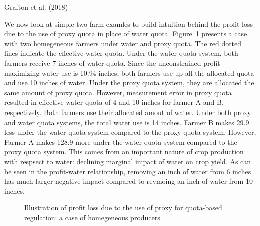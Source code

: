 \documentclass[
  letterpaper,
  DIV=11,
  numbers=noendperiod]{scrartcl}
\begin{document}
Grafton et al. (2018)

We now look at simple two-farm examles to build intuition behind the
profit loss due to the use of proxy quota in place of water quota.
Figure~\ref{fig-illust-homegeneous} presents a case with two homegeneous
farmers under water and proxy quota. The red dotted lines indicate the
effective water quota. Under the water quota system, both farmers
receive 7 inches of water quota. Since the unconstrained profit
maximizing water use is 10.94 inches, both farmers use up all the
allocated quota and use 10 inches of water. Under the proxy quota
system, they are allocated the same amount of proxy quota. However,
measurement error in proxy quota resulted in effective water quota of 4
and 10 inches for farmer A and B, respectively. Both farmers use their
allocated amout of water. Under both proxy and water quota systems, the
total water use is 14 inches. Farmer B makes 29.9 less under the water
quota system compared to the proxy quota system. However, Farmer A makes
128.9 more under the water quota system compared to the proxy quota
system. This comes from an important nature of crop production with
respsect to water: declining marginal impact of water on crop yield. As
can be seen in the profit-water relationship, removing an inch of water
from 6 inches has much larger negative impact compared to revmoing an
inch of water from 10 inches.

\begin{figure}[H]


\caption{\label{fig-illust-homegeneous}Illustration of profit loss due
to the use of proxy for quota-based regulation: a case of homegeneous
producers}

\end{figure}%
\end{document}
